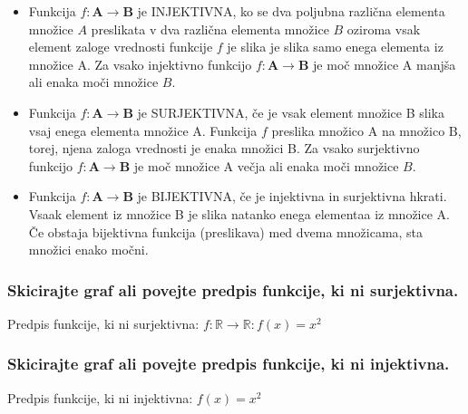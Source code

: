 \documentclass{article}
\begin{document}
\begin{itemize}
\item Funkcija $f: \boldsymbol{A} \rightarrow \boldsymbol{B}$ je INJEKTIVNA, ko se dva poljubna različna elementa množice $A$ preslikata v dva različna elementa množice $B$ oziroma vsak element zaloge vrednosti funkcije $f$ je slika je slika samo enega elementa iz množice A. Za vsako injektivno funkcijo $f: \boldsymbol{A} \rightarrow \boldsymbol{B}$ je moč množice A manjša ali enaka moči množice $B$.

\item Funkcija $f: \boldsymbol{A} \rightarrow \boldsymbol{B}$ je SURJEKTIVNA, če je vsak element množice B slika vsaj enega elementa množice A. Funkcija $f$ preslika množico A na množico $\mathrm{B}$, torej, njena zaloga vrednosti je enaka množici B. Za vsako surjektivno funkcijo $f: \boldsymbol{A} \rightarrow \boldsymbol{B}$ je moč množice A večja ali enaka moči množice $B$.

\item Funkcija $f: \boldsymbol{A} \rightarrow \boldsymbol{B}$ je BIJEKTIVNA, če je injektivna in surjektivna hkrati. Vsaak element iz množice B je slika natanko enega elementaa iz množice A. Če obstaja bijektivna funkcija (preslikava) med dvema množicama, sta množici enako močni.
\end{itemize}
\subsubsection*{Skicirajte graf ali povejte predpis funkcije, ki ni surjektivna.}

Predpis funkcije, ki ni surjektivna: $f: \mathbb{R} \rightarrow \mathbb{R}: f(x)=x^{2}$


\subsubsection*{Skicirajte graf ali povejte predpis funkcije, ki ni injektivna.}

Predpis funkcije, ki ni injektivna: $f(x)=x^{2}$

\end{document}
